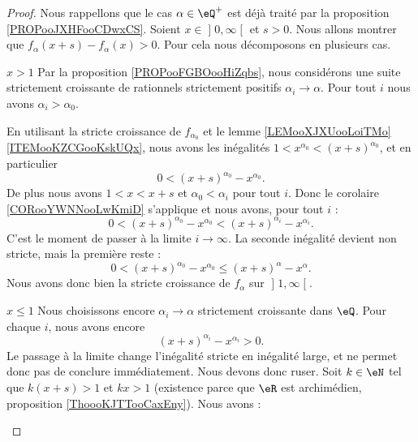 \begin{proof}
    Nous rappellons que le cas \( \alpha\in \eQ^+\) est déjà traité par la proposition \ref{PROPooJXHFooCDwxCS}. Soient \( x\in \mathopen] 0 , \infty \mathclose[\) et \( s>0\). Nous allons montrer que \( f_{\alpha}(x+s)-f_{\alpha}(x)>0\). Pour cela nous décomposons en plusieurs cas.
    \begin{subproof}
        \item[\( x>1\)]
            Par la proposition \ref{PROPooFGBOooHiZqbs}, nous considérons une suite strictement croissante de rationnels strictement positifs \( \alpha_i\to \alpha\). Pour tout \( i\) nous avons \( \alpha_i>\alpha_0\).

            En utilisant la stricte croissance de \( f_{\alpha_0}\) et le lemme \ref{LEMooXJXUooLoiTMo}\ref{ITEMooKZCGooKskUQx}, nous avons les inégalités \( 1<x^{\alpha_0}<(x+s)^{\alpha_0}\), et en particulier
            \begin{equation}
                0<(x+s)^{\alpha_0}-x^{\alpha_0}.
            \end{equation}
            De plus nous avons \( 1<x<x+s\) et \( \alpha_0<\alpha_i\) pour tout \( i\). Donc le corolaire \ref{CORooYWNNooLwKmiD} s'applique et nous avons, pour tout \( i\) :
            \begin{equation}
                0<(x+s)^{\alpha_0}-x^{\alpha_0}<(x+s)^{\alpha_i}-x^{\alpha_i}.
            \end{equation}
            C'est le moment de passer à la limite \( i\to \infty\). La seconde inégalité devient non stricte, mais la première reste :
            \begin{equation}
                0<(x+s)^{\alpha_0}-x^{\alpha_0}\leq(x+s)^{\alpha}-x^{\alpha}.
            \end{equation}
            Nous avons donc bien la stricte croissance de \( f_{\alpha}\) sur \( \mathopen] 1 , \infty \mathclose[\).
        \item[\( x\leq 1\)]
            Nous choisissons encore \( \alpha_i\to \alpha\) strictement croissante dans \( \eQ\). Pour chaque \( i\), nous avons encore
            \begin{equation}
                (x+s)^{\alpha_i}-x^{\alpha_i}>0.
            \end{equation}
            Le passage à la limite change l'inégalité stricte en inégalité large, et ne permet donc pas de conclure immédiatement. Nous devons donc ruser. Soit \( k\in \eN\) tel que \( k(x+s)>1\) et \( kx>1\) (existence parce que \( \eR\) est archimédien, proposition \ref{ThoooKJTTooCaxEny}). Nous avons :

\end{subproof}
\end{proof}
